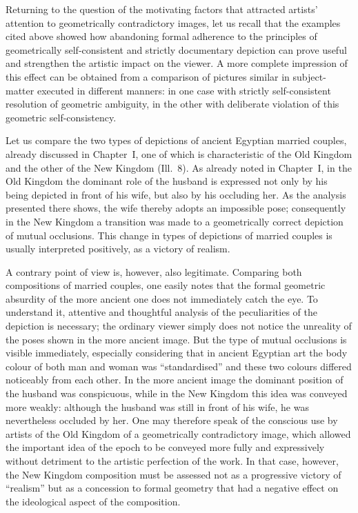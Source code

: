 
Returning to the question of the motivating factors that attracted artists' attention to
geometrically contradictory images, let us recall that the examples cited above showed
how abandoning formal adherence to the principles of geometrically self-consistent and
strictly documentary depiction can prove useful and strengthen the artistic impact on
the viewer.  A more complete impression of this effect can be obtained from a comparison
of pictures similar in subject-matter executed in different manners: in one case with
strictly self-consistent resolution of geometric ambiguity, in the other with deliberate
violation of this geometric self-consistency.

Let us compare the two types of depictions of ancient Egyptian married couples, already
discussed in Chapter~I, one of which is characteristic of the Old Kingdom and the other
of the New Kingdom (Ill.~8).  As already noted in Chapter~I, in the Old Kingdom the
dominant role of the husband is expressed not only by his being depicted in front of his
wife, but also by his occluding her.  As the analysis presented there shows, the wife
thereby adopts an impossible pose; consequently in the New Kingdom a transition was made
to a geometrically correct depiction of mutual occlusions.  This change in types of
depictions of married couples is usually interpreted positively, as a victory of realism.


A contrary point of view is, however, also legitimate.  Comparing both compositions of
married couples, one easily notes that the formal geometric absurdity of the more ancient
one does not immediately catch the eye.  To understand it, attentive and thoughtful
analysis of the peculiarities of the depiction is necessary; the ordinary viewer simply
does not notice the unreality of the poses shown in the more ancient image.  But the type
of mutual occlusions is visible immediately, especially considering that in ancient
Egyptian art the body colour of both man and woman was ``standardised'' and these two
colours differed noticeably from each other.  In the more ancient image the dominant
position of the husband was conspicuous, while in the New Kingdom this idea was conveyed
more weakly: although the husband was still in front of his wife, he was nevertheless
occluded by her.  One may therefore speak of the conscious use by artists of the Old
Kingdom of a geometrically contradictory image, which allowed the important idea of the
epoch to be conveyed more fully and expressively without detriment to the artistic
perfection of the work.  In that case, however, the New Kingdom composition must be
assessed not as a progressive victory of ``realism'' but as a concession to formal
geometry that had a negative effect on the ideological aspect of the composition.

